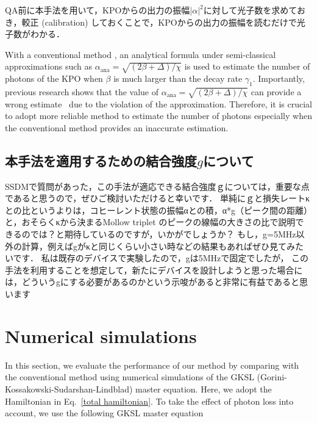 QA前に本手法を用いて，KPOからの出力の振幅$|\alpha|^2$に対して光子数を求めておき，較正 (calibration) しておくことで，KPOからの出力の振幅を読むだけで光子数がわかる．


With a conventional method \cite{puri2017engineering}, an analytical formula under semi-classical approximations such as $\alpha_{\mathrm{ana}}=\sqrt{(2\beta+\Delta)/\chi}$ is used to estimate the number of photons of the KPO when $\beta$ is much larger than the decay rate $\gamma_1$.
Importantly,
previous research shows that 
the
value 
of $\alpha_{\mathrm{ana}}=\sqrt{(2\beta+\Delta)/\chi}$
can provide a wrong estimate~\cite{kanao2021high} due to the violation of the approximation.
Therefore, it is crucial to adopt more reliable method to estimate the number of photons especially when the conventional method provides an inaccurate estimation.


\subsection{本手法を適用するための結合強度$g$について}
SSDMで質問があった，この手法が適応できる結合強度ｇについては，重要な点であると思うので，ぜひご検討いただけると幸いです．
単純にｇと損失レートκとの比というよりは，コヒーレント状態の振幅αとの積，α*g（ピーク間の距離）と，おそらくκから決まるMollow triplet のピークの線幅の大きさの比で説明できるのでは？と期待しているのですが，いかがでしょうか？
もし，g=5MHz以外の計算，例えばgがκと同じくらい小さい時などの結果もあればぜひ見てみたいです．
私は既存のデバイスで実験したので，gは5MHzで固定でしたが，
この手法を利用することを想定して，新たにデバイスを設計しようと思った場合には，どういうgにする必要があるのかという示唆があると非常に有益であると思います


\section{Numerical simulations}
In this section, we evaluate the performance of our method by comparing with the conventional method using numerical simulations of the GKSL (Gorini-Kossakowski-Sudarshan-Lindblad) master equation.
Here, we adopt the Hamiltonian in Eq.~\eqref{total hamiltonian}.
To take the effect of photon loss into account, we use the following GKSL master equation

